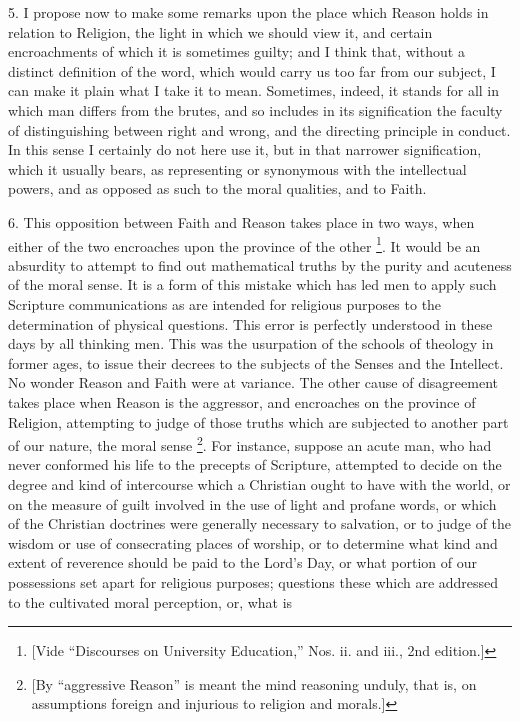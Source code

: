 5. I propose now to make some remarks upon the place which Reason
holds in relation to Religion, the light in which we should view it,
and certain encroachments of which it is sometimes guilty; and I think
that, without a distinct definition of the word, which would carry us
too far from our subject, I can make it plain what I take it to mean.
Sometimes, indeed, it stands for all in which man differs from the
brutes, and so includes in its signification the faculty of
distinguishing between right and wrong, and the directing principle in
conduct. In this sense I certainly do not here use it, but in that
narrower signification, which it usually bears, as representing or
synonymous with the intellectual powers, and as opposed as such to the
moral qualities, and to Faith.

6. This opposition between Faith and Reason takes place in two
ways, when either of the two encroaches upon the province of the other
\footnote{[Vide
``Discourses on University Education,'' Nos. ii. and iii., 2nd
edition.]}. It would be an absurdity
to attempt to find out mathematical truths by the purity and acuteness
of the moral sense. It is a form of this mistake which has led men to
apply such Scripture communications as are intended for religious
purposes to the determination of physical questions. This error is
perfectly understood in these days by all thinking men. This was the
usurpation of the schools of theology in former ages, to issue their
decrees to the subjects of the Senses and the Intellect. No wonder
Reason and Faith were at variance. The other cause of disagreement
takes place when Reason is the aggressor, and encroaches on the
province of Religion, attempting to judge of those truths which are
subjected to another part of our nature, the moral sense \footnote{[By
``aggressive Reason'' is meant the mind reasoning unduly,
that is, on assumptions foreign and injurious to religion and morals.]}. For instance, suppose an acute man, who had never conformed
his life to the precepts of Scripture, attempted to decide on the
degree and kind of intercourse which a Christian ought to have with
the world, or on the measure of guilt involved in the use of light and
profane words, or which of the Christian doctrines were generally
necessary to salvation, or to judge of the wisdom or use of
consecrating places of worship, or to determine what kind and extent
of reverence should be paid to the Lord's Day, or what portion of our
possessions set apart for religious purposes; questions these which
are addressed to the cultivated moral perception, or, what is
